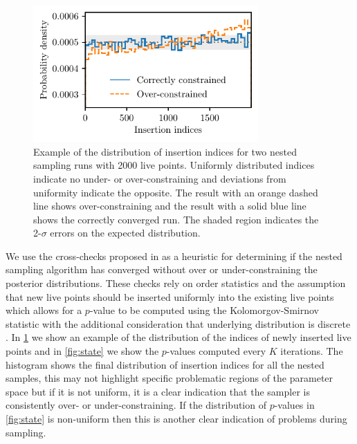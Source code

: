 \documentclass[%
 reprint,
nofootinbib,
 amsmath,amssymb,
 aps,
 prd,
]{revtex4-2}
\newcommand{\figwidth}{8.6cm}
\begin{document}
\begin{figure}
    \centering
    \includegraphics[width=\figwidth]{figures/insertion_indices.pdf}
    \caption{Example of the distribution of insertion indices for two nested sampling runs with 2000 live points. Uniformly distributed indices indicate no under- or over-constraining and deviations from uniformity indicate the opposite. The result with an orange dashed line shows over-constraining and the result with a solid blue line shows the correctly converged run. The shaded region indicates the 2-$\sigma$ errors on the expected distribution.}
    \label{fig:insertion_indices}
\end{figure}

We use the cross-checks proposed in \cite{Fowlie:2020} as a heuristic for determining if the nested sampling algorithm has converged without over or under-constraining the posterior distributions. These checks rely on order statistics and the assumption that new live points should be inserted uniformly into the existing live points which allows for a $p$-value to be computed using the Kolomorgov-Smirnov statistic \cite{Smirnov:1948table} with the additional consideration that underlying distribution is discrete \cite{Arnold:2011npgof}. In \cref{fig:insertion_indices} we show an example of the distribution of the indices of newly inserted live points and in \cref{fig:state} we show the $p$-values computed every $K$ iterations. The histogram shows the final distribution of insertion indices for all the nested samples, this may not highlight specific problematic regions of the parameter space but if it is not uniform, it is a clear indication that the sampler is consistently over- or under-constraining. If the distribution of $p$-values in \cref{fig:state} is non-uniform then this is another clear indication of problems during sampling.
\end{document}
